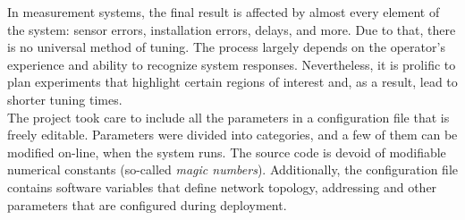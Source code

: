 In measurement systems, the final result is affected by almost every element of the system: sensor errors, installation errors, delays, and more. Due to that, there is no universal method of tuning. The process largely depends on the operator's experience and ability to recognize system responses. Nevertheless, it is prolific to plan experiments that highlight certain regions of interest and, as a result, lead to shorter tuning times.\\

The project took care to include all the parameters in a configuration file that is freely editable. Parameters were divided into categories, and a few of them can be modified on-line, when the system runs. The source code is devoid of modifiable numerical constants (so-called \textit{magic numbers}). Additionally, the configuration file contains software variables that define network topology, addressing and other parameters that are configured during deployment.

